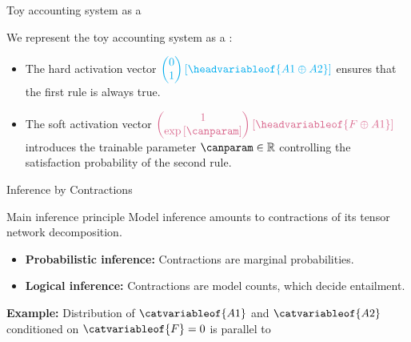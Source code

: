 \documentclass{beamer}
\begin{document}
    \begin{frame}{Toy accounting system as a \CompActNet{}}

        We represent the toy accounting system as a \ComputationActivationNetwork{}:
        \begin{center}
            
        \end{center}

        \begin{itemize}
            \item The hard activation vector $\textcolor{\concolor}{\coloredmatrixof{0 \\ 1}{\headvariableof{A1\oplus A2}}}$ ensures that the first rule is always true.
            \item The soft activation vector $\textcolor{\probcolor}{\coloredmatrixof{1 \\ \expof{\canparam}}{\headvariableof{F\oplus A1}}}$ introduces the trainable parameter $\canparam\in\rr$ controlling the satisfaction probability of the second rule.
        \end{itemize}
    \end{frame}


    \begin{frame}{Inference by Contractions}
        \begin{block}{Main inference principle}
            Model inference amounts to contractions of its tensor network decomposition.
        \end{block}

        \begin{itemize}
            \item {\bf Probabilistic inference:} Contractions are marginal probabilities.
            \item {\bf Logical inference:} Contractions are model counts, which decide entailment.
        \end{itemize}

            {\bf Example:} Distribution of $\catvariableof{A1}$ and $\catvariableof{A2}$ conditioned on $\catvariableof{F}=0$ is parallel to
        \begin{center}
            
        \end{center}

    \end{frame}
\end{document}
